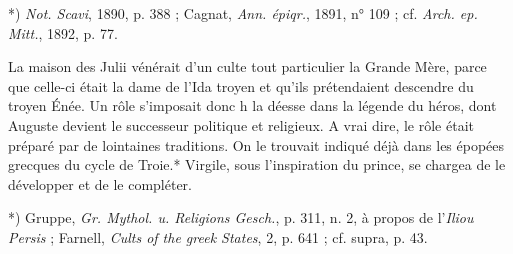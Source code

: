 \documentclass[a4paper, 11pt, oneside, polutonikogreek, french]{article}
\begin{document}
*) \emph{Not. Scavi}, 1890, p. 388 ; Cagnat, \emph{Ann. épiqr.}, 1891, n° 109 ; cf. \emph{Arch. ep. Mitt.}, 1892, p. 77.

La maison des Julii vénérait d'un culte tout particulier la Grande Mère, parce que celle-ci était la dame de l'Ida troyen et qu'ils prétendaient descendre du troyen Énée. Un rôle s'imposait donc h la déesse dans la légende du héros, dont Auguste devient le successeur politique et religieux. A vrai dire, le rôle était préparé par de lointaines traditions. On le trouvait indiqué déjà dans les épopées grecques du cycle de Troie.* Virgile, sous l'inspiration du prince, se chargea de le développer et de le compléter.

*) Gruppe, \emph{Gr. Mythol. u. Religions Gesch.}, p. 311, n. 2, à propos de l'\emph{Iliou Persis} ; Farnell, \emph{Cults of the greek States}, 2, p. 641 ; cf. supra, p. 43.
\end{document}
